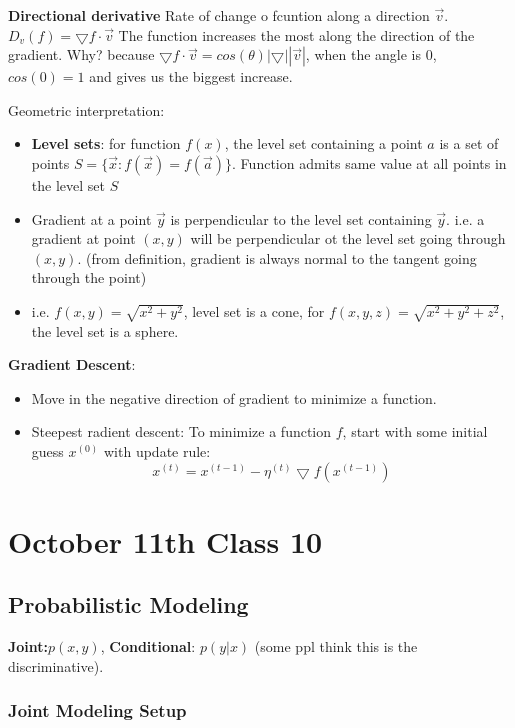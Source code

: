 \textbf{Directional derivative} Rate of change o fcuntion along a
direction $\vec v$. $D_v(f) = \bigtriangledown f\cdot \vec v$
The function increases the most along the direction of the
gradient. Why? because $\bigtriangledown f\cdot \vec v =
cos(\theta)|\bigtriangledown||\vec v|$, when the angle is 0,
$cos(0)=1$ and gives us the biggest increase.


Geometric interpretation:
\begin{itemize}
\item \textbf{Level sets}: for function $f(x)$, the level set
  containing a point $a$ is a set of points $S=\{\vec x: f(\vec x) =
  f(\vec a)\}$. Function admits same value at all points in the level
  set $S$
\item Gradient at a point $\vec y$ is perpendicular to the level set
  containing $\vec y$. i.e. a gradient at point $(x,y)$ will be
  perpendicular ot the level set going through $(x,y)$. (from
  definition, gradient is always normal to the tangent going through
  the point)
\item i.e. $f(x,y) = \sqrt{x^2 + y^2}$, level set is a cone, for
  $f(x,y,z) = \sqrt{x^2 + y^2+z^2}$, the level set is a sphere.
\end{itemize}

\textbf{Gradient Descent}:
\begin{itemize}
\item Move in the negative direction of gradient to minimize a
  function.
\item Steepest radient descent: To minimize a function $f$, start with
  some initial guess $x^(0)$ with update rule:
$$x^{(t)} = x^{(t-1)} -\eta^{(t)}\bigtriangledown f(x^{(t-1)})$$
\end{itemize}
\pagebreak

\section{October 11th Class 10}
\label{sec:class10}

\subsection{Probabilistic Modeling}

\textbf{Joint:}$p(x,y)$, \textbf{Conditional}: $p(y|x)$ (some ppl
think this is the discriminative).

\subsubsection{Joint Modeling Setup}
\label{sec:joint}

